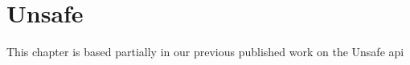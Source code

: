 
\chapter{Unsafe}

This chapter is based partially in our previous published work on the Unsafe api \cite{mastrangelo_use_2015}
